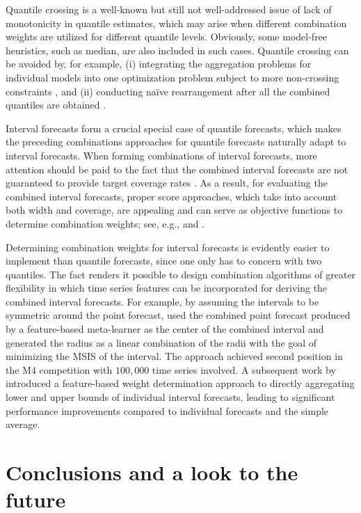 \documentclass[11pt]{article}
\begin{document}
Quantile crossing is a well-known but still not well-addressed issue of lack of monotonicity in quantile estimates, which may arise when different combination weights are utilized for different quantile levels. Obviously, some model-free heuristics, such as median, are also included in such cases. Quantile crossing can be avoided by, for example, (i) integrating the aggregation problems for individual models into one optimization problem subject to more non-crossing constraints \citep[e.g.,][]{Kim2021-wa}, and (ii) conducting na\"{i}ve rearrangement after all the combined quantiles are obtained \citep[e.g.,][]{Chernozhukov2010-zz}.

Interval forecasts form a crucial special case of quantile forecasts, which makes the preceding combinations approaches for quantile forecasts naturally adapt to interval forecasts. When forming combinations of interval forecasts, more attention should be paid to the fact that the combined interval forecasts are not guaranteed to provide target coverage rates \citep{Wallis2005-yf,Timmermann2006-en,Grushka-Cockayne2020-qv}. As a result, for evaluating the combined interval forecasts, proper score approaches, which take into account both width and coverage, are appealing and can serve as objective functions to determine combination weights; see, e.g., \citet{Gneiting2007-ij} and \citet{Jose2009-lh}.

Determining combination weights for interval forecasts is evidently easier to implement than quantile forecasts, since one only has to concern with two quantiles. The fact renders it possible to design combination algorithms of greater flexibility in which time series features can be incorporated for deriving the combined interval forecasts. For example, by assuming the intervals to be symmetric around the point forecast, \citet{Montero-Manso2020-tq} used the combined point forecast produced by a feature-based meta-learner as the center of the combined interval and generated the radius as a linear combination of the radii with the goal of minimizing the MSIS \citep[mean scaled interval score,][]{Gneiting2007-ij} of the interval. The approach achieved second position in the M4 competition with $100,000$ time series involved. A subsequent work by \citet{Wang2021-un} introduced a feature-based weight determination approach to directly aggregating lower and upper bounds of individual interval forecasts, leading to significant performance improvements compared to individual forecasts and the simple average.


\section{Conclusions and a look to the future}
\label{sec:conclusion}
\end{document}
